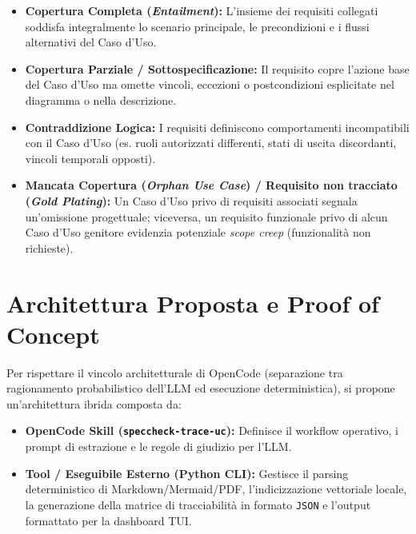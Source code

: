 \documentclass[a4paper, 11pt]{article}
\begin{document}
\begin{itemize}
    \item \textbf{Copertura Completa (\textit{Entailment}):} L'insieme dei requisiti collegati soddisfa integralmente lo scenario principale, le precondizioni e i flussi alternativi del Caso d'Uso.
    \item \textbf{Copertura Parziale / Sottospecificazione:} Il requisito copre l'azione base del Caso d'Uso ma omette vincoli, eccezioni o postcondizioni esplicitate nel diagramma o nella descrizione.
    \item \textbf{Contraddizione Logica:} I requisiti definiscono comportamenti incompatibili con il Caso d'Uso (es. ruoli autorizzati differenti, stati di uscita discordanti, vincoli temporali opposti).
    \item \textbf{Mancata Copertura (\textit{Orphan Use Case}) / Requisito non tracciato (\textit{Gold Plating}):} Un Caso d'Uso privo di requisiti associati segnala un'omissione progettuale; viceversa, un requisito funzionale privo di alcun Caso d'Uso genitore evidenzia potenziale \textit{scope creep} (funzionalità non richieste).
\end{itemize}

\section{Architettura Proposta e Proof of Concept}

Per rispettare il vincolo architetturale di OpenCode (separazione tra ragionamento probabilistico dell'LLM ed esecuzione deterministica), si propone un'architettura ibrida composta da:
\begin{itemize}[noitemsep]
    \item \textbf{OpenCode Skill (\texttt{speccheck-trace-uc}):} Definisce il workflow operativo, i prompt di estrazione e le regole di giudizio per l'LLM.
    \item \textbf{Tool / Eseguibile Esterno (Python CLI):} Gestisce il parsing deterministico di Markdown/Mermaid/PDF, l'indicizzazione vettoriale locale, la generazione della matrice di tracciabilità in formato \texttt{JSON} e l'output formattato per la dashboard TUI.
\end{itemize}
\end{document}
